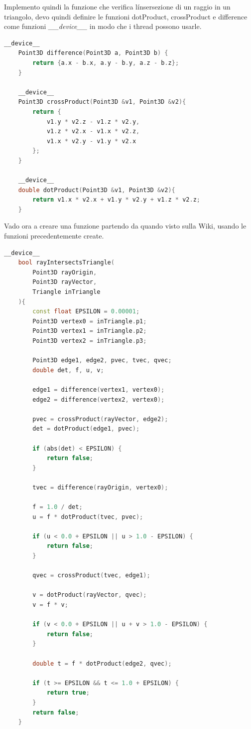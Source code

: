 \documentclass[a4paper]{article}
\begin{document}
Implemento quindi la funzione che verifica l\'insersezione di un raggio in un triangolo, devo quindi definire le funzioni dotProduct, crossProduct e difference come funzioni \emph{\_\_device\_\_} in modo che i thread possono usarle.

\begin{lstlisting}[language=c++]
    __device__ 
    Point3D difference(Point3D a, Point3D b) {
        return {a.x - b.x, a.y - b.y, a.z - b.z};
    }

    __device__ 
    Point3D crossProduct(Point3D &v1, Point3D &v2){
        return {    
            v1.y * v2.z - v1.z * v2.y, 
            v1.z * v2.x - v1.x * v2.z,
            v1.x * v2.y - v1.y * v2.x
        };
    }

    __device__ 
    double dotProduct(Point3D &v1, Point3D &v2){
        return v1.x * v2.x + v1.y * v2.y + v1.z * v2.z;
    }
\end{lstlisting}

\newpage

Vado ora a creare una funzione partendo da quando visto sulla Wiki, usando le funzioni precedentemente create.

\begin{lstlisting}[language=c++]
    __device__ 
    bool rayIntersectsTriangle(
        Point3D rayOrigin, 
        Point3D rayVector,
        Triangle inTriangle
    ){
        const float EPSILON = 0.00001;
        Point3D vertex0 = inTriangle.p1;
        Point3D vertex1 = inTriangle.p2;
        Point3D vertex2 = inTriangle.p3;

        Point3D edge1, edge2, pvec, tvec, qvec;
        double det, f, u, v;

        edge1 = difference(vertex1, vertex0);
        edge2 = difference(vertex2, vertex0);

        pvec = crossProduct(rayVector, edge2);
        det = dotProduct(edge1, pvec);

        if (abs(det) < EPSILON) {
            return false;
        }

        tvec = difference(rayOrigin, vertex0);

        f = 1.0 / det;
        u = f * dotProduct(tvec, pvec);

        if (u < 0.0 + EPSILON || u > 1.0 - EPSILON) {
            return false;
        }

        qvec = crossProduct(tvec, edge1);

        v = dotProduct(rayVector, qvec);
        v = f * v;

        if (v < 0.0 + EPSILON || u + v > 1.0 - EPSILON) {
            return false;
        }

        double t = f * dotProduct(edge2, qvec);

        if (t >= EPSILON && t <= 1.0 + EPSILON) {
            return true;
        }
        return false;
    }
\end{lstlisting}
\end{document}
